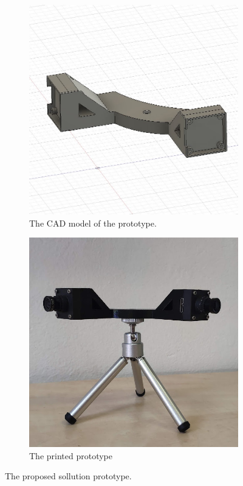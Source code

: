 \begin{figure}[h]
  \begin{subfigure}[b]{0.49\textwidth}
    \centering
    \includegraphics[width=\textwidth]{graphics/CAD.jpg}
    \caption{The CAD model of the prototype.}
    \label{fig:proto_scheme}
  \end{subfigure}
  \hfill
  \begin{subfigure}[b]{0.49\textwidth}
    \centering
    \includegraphics[width=\textwidth]{graphics/prototype.jpg}
    \caption{The printed prototype}
    \label{fig:proto_printed}
  \end{subfigure}
  \caption{The proposed sollution prototype.}
  \label{fig:prototype}
\end{figure}

